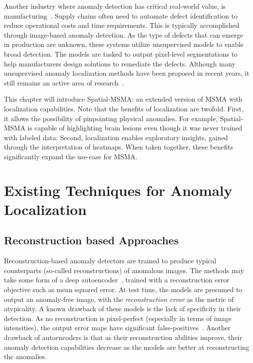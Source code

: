 Another industry where anomaly detection has critical real-world value, is manufacturing~\cite{Bergmann_2019_CVPR}. Supply chains often need to automate defect identification to reduce operational costs and time requirements. This is typically accomplished through image-based anomaly detection. As the type of defects that can emerge in production are unknown, these systems utilize unsupervised models to enable broad detection. The models are tasked to output pixel-level segmentations to help manufacturers design solutions to remediate the defects. Although many unsupervised anomaly localization methods have been proposed in recent years, it still remains an active area of research~\cite{liu2024deep}. 


This chapter will introduce Spatial-MSMA: an extended version of MSMA with localization capabilities. Note that the benefits of localization are twofold. First, it allows the possibility of pinpointing physical anomalies. For example, Spatial-MSMA is capable of highlighting brain lesions even though it was never trained with labeled data. Second, localization enables exploratory insights, gained through the interpretation of heatmaps.
When taken together, these benefits significantly expand the use-case for MSMA.


\section{Existing Techniques for Anomaly Localization}

\subsection*{Reconstruction based Approaches}
Reconstruction-based anomaly detectors are trained to produce typical counterparts (so-called reconstructions) of anomalous images. The methods may take some form of a deep autoencoder~\cite{dae-kascenas22a,baur2021}, trained with a reconstruction error objective such as mean squared error. At test time, the models are presumed to output an anomaly-free image, with the \textit{reconstruction error} as the metric of atypicality. A known drawback of these models is the lack of specificity in their detection. As no reconstruction is pixel-perfect (especially in terms of image intensities), the output error maps have significant false-positives~\cite{baur2021}. Another drawback of autoencoders is that as their reconstruction abilities improve, their anomaly detection capabilities decrease as the models are better at reconstructing the anomalies.

